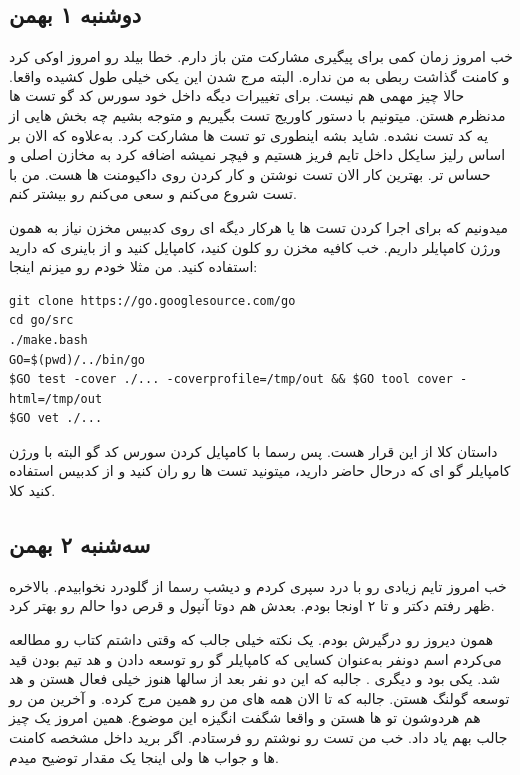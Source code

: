 \subsection{دوشنبه ۱ بهمن}
خب امروز زمان کمی برای پیگیری مشارکت متن باز دارم. خطا بیلد رو  امروز اوکی کرد و کامنت گذاشت ربطی به \cl من نداره.
البته مرج شدن این یکی خیلی طول کشیده واقعا. حالا چیز مهمی هم نیست. برای تغییرات دیگه داخل خود سورس کد گو تست ها مدنظرم هستن.
میتونیم با دستور  کاوریج تست بگیریم و متوجه بشیم چه بخش هایی از یه کد تست نشده. شاید بشه اینطوری تو تست ها مشارکت کرد.
به‌علاوه که الان بر اساس رلیز سایکل داخل تایم فریز هستیم و فیچر نمیشه اضافه کرد به مخازن اصلی و حساس تر. بهترین کار الان تست نوشتن
و کار کردن روی داکیومنت ها هست. من با تست شروع می‌کنم و سعی می‌کنم  رو بیشتر کنم.

میدونیم که برای اجرا کردن تست ها یا هرکار دیگه ای روی کدبیس مخزن  نیاز به همون ورژن کامپایلر داریم.
خب کافیه مخزن رو کلون کنید، کامپایل کنید و از باینری که دارید استفاده کنید. من مثلا خودم رو میزنم اینجا:
\begin{latin}
\begin{verbatim}
git clone https://go.googlesource.com/go
cd go/src
./make.bash
GO=$(pwd)/../bin/go
$GO test -cover ./... -coverprofile=/tmp/out && $GO tool cover -html=/tmp/out
$GO vet ./...
\end{verbatim}
\end{latin}

داستان کلا از این قرار هست. پس رسما با کامپایل کردن سورس کد گو البته با ورژن کامپایلر گو ای که درحال حاضر دارید، میتونید تست ها رو ران کنید
و از کدبیس استفاده کنید کلا.

\subsection{سه‌شنبه ۲ بهمن}
خب امروز تایم زیادی رو با درد سپری کردم و دیشب رسما از گلودرد نخوابیدم. بالاخره ظهر رفتم دکتر و تا ۲ اونجا بودم. بعدش هم
دوتا آنپول و قرص دوا حالم رو بهتر کرد.

همون \cl دیروز رو درگیرش بودم. یک نکته خیلی جالب که وقتی داشتم کتاب  رو مطالعه می‌کردم اسم
دونفر به‌عنوان کسایی که کامپایلر گو رو توسعه دادن و هد تیم بودن قید شد. یکی  بود و دیگری .
جالبه که این دو نفر بعد از سالها هنوز خیلی فعال هستن و هد توسعه گولنگ هستن. جالبه که تا الان همه \cl های من رو همین  مرج کرده.
و آخرین \cl من رو هم هردوشون تو  ها هستن و واقعا شگفت انگیزه این موضوع. همین  امروز یک چیز جالب بهم یاد داد.
خب من تست رو نوشتم رو فرستادم. اگر برید داخل \cl مشخصه کامنت ها و جواب ها ولی اینجا یک مقدار توضیح میدم.

